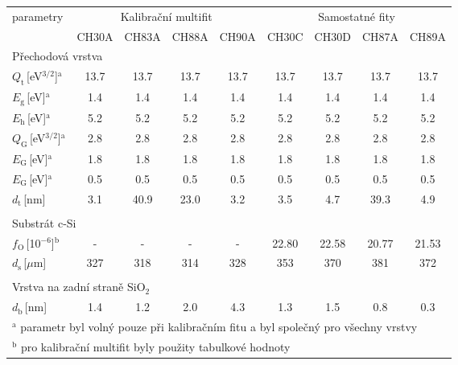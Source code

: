 \begin{tabular}{lcccccccc}
\hline
parametry & \multicolumn{4}{c}{Kalibrační multifit} & \multicolumn{4}{c}{Samostatné fity}\\
 & CH30A & CH83A & CH88A & CH90A & CH30C & CH30D & CH87A & CH89A\\
\hline
\multicolumn{9}{l}{Přechodová vrstva}\\
\hline
$Q_\mathrm{t}$\,[eV$^{3/2}$]$^\mathrm{a}$ & 13.7 & 13.7 & 13.7 & 13.7 & 13.7 & 13.7 & 13.7 & 13.7\\
$E_\mathrm{g}$\,[eV]$^\mathrm{a}$ & 1.4 & 1.4 & 1.4 & 1.4 & 1.4 & 1.4 & 1.4 & 1.4\\
$E_\mathrm{h}$\,[eV]$^\mathrm{a}$ & 5.2 & 5.2 & 5.2 & 5.2 & 5.2 & 5.2 & 5.2 & 5.2\\
$Q_\mathrm{G}$\,[eV$^{3/2}$]$^\mathrm{a}$ & 2.8 & 2.8 & 2.8 & 2.8 & 2.8 & 2.8 & 2.8 & 2.8\\
$E_\mathrm{G}$\,[eV]$^\mathrm{a}$ & 1.8 & 1.8 & 1.8 & 1.8 & 1.8 & 1.8 & 1.8 & 1.8\\
$E_\mathrm{G}$\,[eV]$^\mathrm{a}$ & 0.5 & 0.5 & 0.5 & 0.5 & 0.5 & 0.5 & 0.5 & 0.5\\
$d_\mathrm{t}$\,[nm] & 3.1 & 40.9 & 23.0 & 3.2 & 3.5 & 4.7 & 39.3 & 4.9\\
\multicolumn{9}{l}{}\\
\multicolumn{9}{l}{Substrát c-Si}\\
\hline
$f_\mathrm{O}$\,[10$^{-6}$]$^\mathrm{b}$ & - & - & - & - & 22.80 & 22.58 & 20.77 & 21.53\\
$d_\mathrm{s}$\,[$\mu$m] & 327 & 318 & 314 & 328 & 353 & 370 & 381 & 372\\
\multicolumn{9}{l}{}\\
\multicolumn{9}{l}{Vrstva na zadní straně SiO$_2$}\\
\hline
$d_\mathrm{b}$\,[nm] & 1.4 & 1.2 & 2.0 & 4.3 & 1.3 & 1.5 & 0.8 & 0.3\\

\hline
\multicolumn{9}{l}{$^\mathrm{a}$ parametr byl volný pouze při kalibračním fitu a byl společný pro všechny vrstvy}\\
\multicolumn{9}{l}{$^\mathrm{b}$ pro kalibrační multifit byly použity tabulkové hodnoty}\\
\end{tabular}

